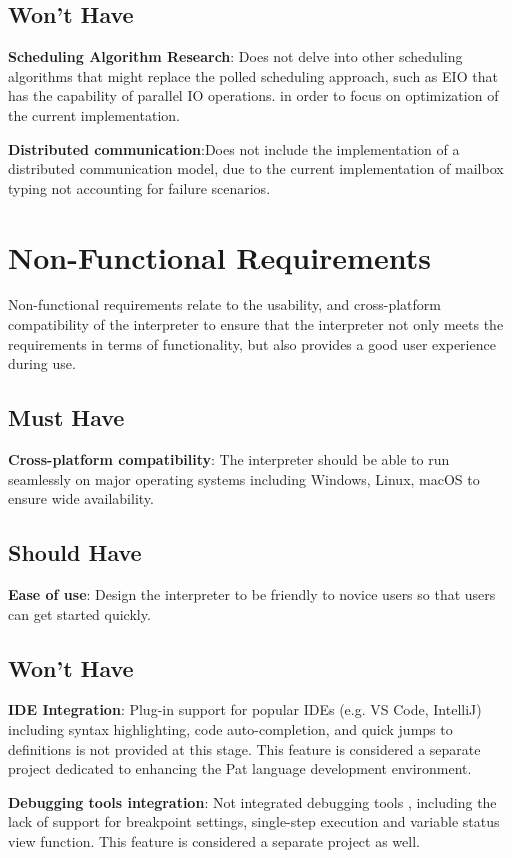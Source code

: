 \documentclass{l4proj}
\begin{document}
\subsection{Won't Have}
\textbf{Scheduling Algorithm Research}: Does not delve into other scheduling algorithms that might replace the polled scheduling approach, such as EIO that has the capability of parallel IO operations. in order to focus on optimization of the current implementation.

\textbf{Distributed communication}:Does not include the implementation of a distributed communication model, due to the current implementation of mailbox typing not accounting for failure scenarios. 

\section{Non-Functional Requirements}
Non-functional requirements relate to the usability, and cross-platform compatibility of the interpreter to ensure that the interpreter not only meets the requirements in terms of functionality, but also provides a good user experience during use.

\subsection{Must Have}
\textbf{Cross-platform compatibility}: The interpreter should be able to run seamlessly on major operating systems including Windows, Linux, macOS to ensure wide availability.

\subsection{Should Have}
\textbf{Ease of use}: Design the interpreter to be friendly to novice users so that users can get started quickly.

\subsection{Won't Have}
\textbf{IDE Integration}: Plug-in support for popular IDEs (e.g. VS Code, IntelliJ) including syntax highlighting, code auto-completion, and quick jumps to definitions is not provided at this stage. This feature is considered a separate project dedicated to enhancing the Pat language development environment.

\textbf{Debugging tools integration}: Not integrated debugging tools , including the lack of support for breakpoint settings, single-step execution and variable status view function. This feature is considered a separate project as well.
\end{document}

